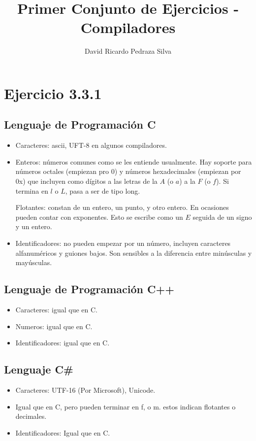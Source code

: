 \documentclass{article}
\author{David Ricardo Pedraza Silva}
\title{Primer Conjunto de Ejercicios - Compiladores}
\begin{document}
\maketitle
\section*{Ejercicio 3.3.1}
\subsection*{Lenguaje de Programación C}
\begin{itemize}
	\item Caracteres: ascii, UFT-8 en algunos compiladores.
	\item	Enteros: números comunes como se les entiende usualmente. Hay soporte para números octales (empiezan pro 0) y números hexadecimales (empiezan por 0x) que incluyen como dígitos a las letras de la $A$ (o $a$) a la $F$ (o $f$). Si termina en $l$ o $L$, pasa a ser de tipo long.

	 	Flotantes: constan de un entero, un punto, y otro entero. En ocasiones pueden contar con exponentes. Esto se escribe como un $E$ seguida de un signo y un entero.
	\item Identificadores: no pueden empezar por un número, incluyen caracteres alfanuméricos y guiones bajos. Son sensibles a la diferencia entre minúsculas y mayúsculas.
\end{itemize}
\subsection*{Lenguaje de Programación C++}
\begin{itemize}
	\item Caracteres: igual que en C.
	\item Numeros: igual que en C.
	\item Identificadores: igual que en C.
\end{itemize}
\subsection*{Lenguaje C\#}
\begin{itemize}
	\item Caracteres: UTF-16 (Por Microsoft), Unicode.
	\item Igual que en C, pero pueden terminar en f, o m. estos indican flotantes o decimales. 
	\item Identificadores: Igual que en C.
\end{itemize}
\end{document}
